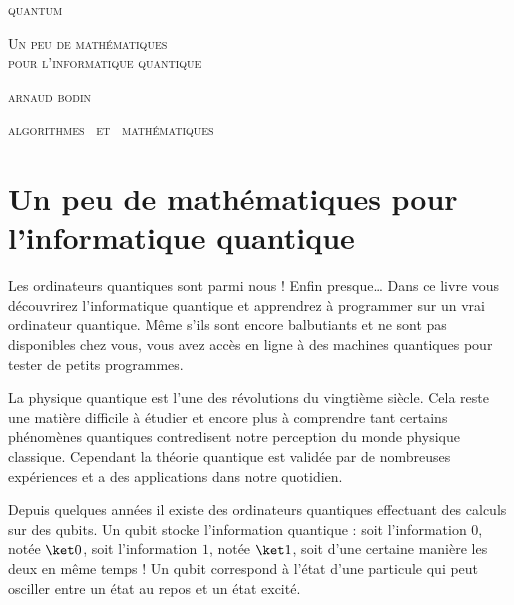 
\pagestyle{empty}\thispagestyle{empty}
\vspace*{\fill}
\vspace*{5ex}
\begin{center}
	\fontsize{40}{40}\selectfont
	\textsc{quantum}
	
	\vspace*{1ex}
	\textsc{\fontsize{24}{24}\selectfont 
	Un peu de mathématiques  \\[-1.5ex]
	pour l'informatique quantique
	}
	
	\vspace*{2ex}
	
	\Large
	\textsc{arnaud bodin}

\end{center}
\vfill
\begin{center}
	\Large
	\textsc{algorithmes \  et \  mathématiques}
\end{center}
\begin{center}
\end{center}

\clearpage

\thispagestyle{empty}


\vspace*{\fill}
\section*{Un peu de mathématiques pour l'informatique quantique}


Les ordinateurs quantiques sont parmi nous ! Enfin presque\ldots{}
Dans ce livre vous découvrirez l'informatique quantique et apprendrez à programmer sur un vrai ordinateur quantique.
Même s'ils sont encore balbutiants et ne sont pas disponibles chez vous, vous avez accès en ligne à des machines quantiques pour tester de petits programmes. 

\medskip

La physique quantique est l'une des révolutions du vingtième siècle. Cela reste une matière difficile à étudier et encore plus à comprendre tant certains phénomènes quantiques contredisent notre perception du monde physique classique. Cependant la théorie quantique est validée par de nombreuses expériences et a des applications dans notre quotidien.

\medskip

Depuis quelques années il existe des ordinateurs quantiques effectuant des calculs sur des \og{}qubits\fg{}.
Un qubit stocke l'information quantique : soit l'information $0$, notée $\ket0$, soit l'information $1$, notée $\ket1$, soit d'une certaine manière les deux en même temps ! Un qubit correspond à l'état d'une particule qui peut osciller entre un état au repos et un état excité.

